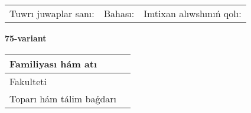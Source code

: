 \documentclass{article}
\begin{document}
\vspace{1cm}

\begin{tabular}{lll}
Tuwrı juwaplar sanı: \underline{\hspace{1.5cm}} & 
Bahası: \underline{\hspace{1.5cm}} & 
Imtixan alıwshınıń qolı: \underline{\hspace{2cm}} \\
\end{tabular}

\egroup

\newpage


\textbf{75-variant}\\

\bgroup
\def\arraystretch{1.6} %

\begin{tabular}{|m{5.7cm}|m{9.5cm}|}
\hline
Familiyası hám atı & \\
\hline
Fakulteti  & \\
\hline
Toparı hám tálim baǵdarı  & \\
\hline
\end{tabular}

\vspace{1cm}
\end{document}
